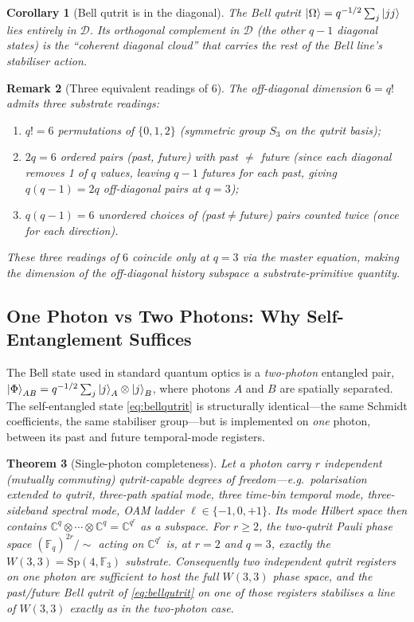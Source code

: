 ﻿\documentclass[12pt]{article}
\newtheorem{theorem}{Theorem}[section]
\newtheorem{corollary}[theorem]{Corollary}
\newtheorem{remark}[theorem]{Remark}
\newcommand{\CC}{\mathbb{C}}
\newcommand{\Sp}{\mathrm{Sp}}
\newcommand{\GF}[1]{\mathbb{F}_{#1}}
\begin{document}
\begin{corollary}[Bell qutrit is in the diagonal]\label{cor:bell_in_diagonal}
The Bell qutrit $\ket{\Omega} = q^{-1/2}\sum_j\ket{jj}$ lies entirely in
$\mathcal D$.  Its orthogonal complement in $\mathcal D$ (the other $q-1$
diagonal states) is the ``coherent diagonal cloud'' that carries the rest of the
Bell line's stabiliser action.
\end{corollary}

\begin{remark}[Three equivalent readings of $6$]
The off-diagonal dimension $6 = q!$ admits three substrate readings:
\begin{enumerate}[label=(\alph*),noitemsep]
  \item $q! = 6$ permutations of $\{0,1,2\}$ (symmetric group $S_3$ on the
    qutrit basis);
  \item $2q = 6$ ordered pairs (past, future) with past $\ne$ future (since
    each diagonal removes 1 of $q$ values, leaving $q-1$ futures for each
    past, giving $q(q-1) = 2q$ off-diagonal pairs at $q=3$);
  \item $q(q-1) = 6$ unordered choices of (past$\ne$future) pairs counted twice
    (once for each direction).
\end{enumerate}
These three readings of $6$ coincide \emph{only} at $q = 3$ via the master
equation, making the dimension of the off-diagonal history subspace a
substrate-primitive quantity.
\end{remark}

\subsection{One Photon vs Two Photons: Why Self-Entanglement Suffices}
\label{sec:one_vs_two}

The Bell state used in standard quantum optics is a \emph{two-photon} entangled
pair, $\ket{\Phi}_{AB} = q^{-1/2}\sum_j\ket{j}_A\otimes\ket{j}_B$, where photons
$A$ and $B$ are spatially separated.  The self-entangled state
\eqref{eq:bellqutrit} is structurally identical---the same Schmidt coefficients,
the same stabiliser group---but is implemented on \emph{one} photon, between
its past and future temporal-mode registers.

\begin{theorem}[Single-photon completeness]\label{thm:1photon_completeness}
Let a photon carry $r$ independent (mutually commuting) qutrit-capable degrees
of freedom---e.g.\ polarisation extended to qutrit, three-path spatial mode,
three time-bin temporal mode, three-sideband spectral mode, OAM ladder
$\ell\in\{-1,0,+1\}$.  Its mode Hilbert space then contains
$\CC^q \otimes \cdots \otimes \CC^q = \CC^{q^r}$ as a subspace.
For $r \ge 2$, the two-qutrit Pauli phase space $(\GF{q})^{2r}/\sim$ acting on
$\CC^{q^r}$ is, at $r = 2$ and $q = 3$, exactly the $W(3,3) = \Sp(4,\GF{3})$
substrate.  Consequently \emph{two independent qutrit registers on one photon
are sufficient to host the full $W(3,3)$ phase space}, and the past/future
Bell qutrit of \eqref{eq:bellqutrit} on one of those registers stabilises a
line of $W(3,3)$ exactly as in the two-photon case.
\end{theorem}
\end{document}
